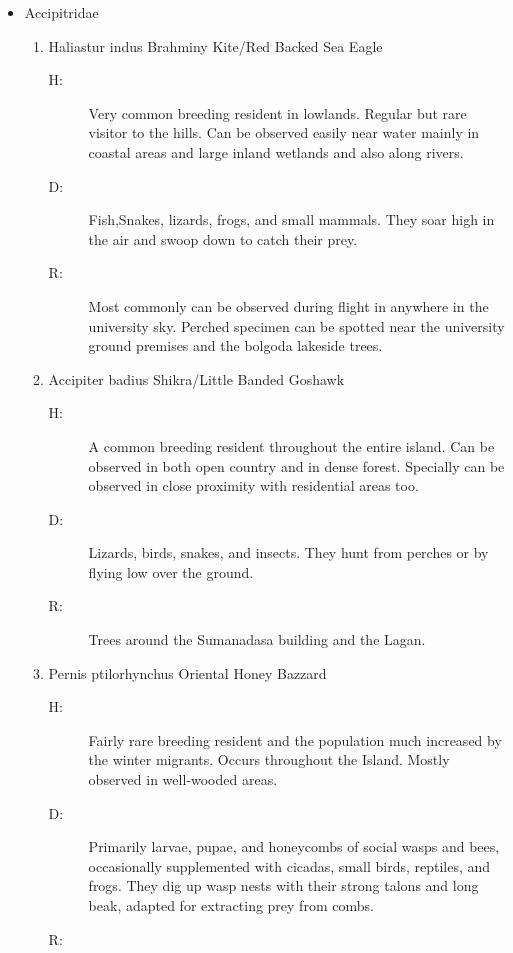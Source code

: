 \begin{itemize}%
\item%
 Accipitridae%
\begin{enumerate}%
\item%
Haliastur indus\newline%
Brahminy Kite/Red Backed Sea Eagle%
\begin{description}%
\item[H: ]%
Very common breeding resident in lowlands. Regular but rare visitor to the hills. Can be observed easily near water mainly in coastal areas and large inland wetlands and also along rivers.%
\item[D: ]%
Fish,Snakes, lizards, frogs, and small mammals. They soar high in the air and swoop down to catch their prey.%
\item[R: ]%
Most commonly can  be observed during flight in anywhere in the university sky. Perched specimen can be spotted near the university ground premises and the bolgoda lakeside trees.%
\end{description}%
\item%
Accipiter badius\newline%
Shikra/Little Banded Goshawk%
\begin{description}%
\item[H: ]%
A common breeding resident throughout the entire island. Can be observed in both open country and in dense forest. Specially can be observed in close proximity with residential areas too.%
\item[D: ]%
 Lizards, birds, snakes, and insects. They hunt from perches or by flying low over the ground.%
\item[R: ]%
Trees around the Sumanadasa building and the Lagan.%
\end{description}%
\item%
Pernis ptilorhynchus\newline%
Oriental Honey Bazzard%
\begin{description}%
\item[H: ]%
Fairly rare breeding resident and the population much increased by the winter migrants. Occurs throughout the Island. Mostly observed in well{-}wooded areas.%
\item[D: ]%
Primarily larvae, pupae, and honeycombs of social wasps and bees, occasionally supplemented with cicadas, small birds, reptiles, and frogs. They dig up wasp nests with their strong talons and long beak, adapted for extracting prey from combs.%
\item[R: ]%

\end{description}
\end{enumerate}
\end{itemize}
